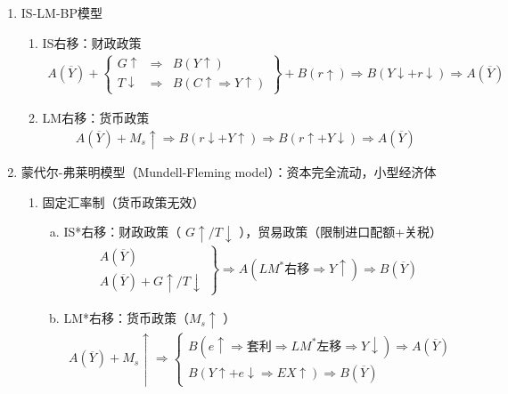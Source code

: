 \documentclass[12pt]{book}
\begin{document}
\begin{enumerate}[1.]
    \item IS-LM-BP模型
    \begin{enumerate}[(1)]
        \item IS右移：财政政策
        \begin{gather*}
            A(\overline{Y})+ \left\{\begin{matrix} G\uparrow&\Rightarrow& B(Y\uparrow)\\ 
            T\downarrow &\Rightarrow&  B(C\uparrow\Rightarrow Y\uparrow) \end{matrix}\right\}  +B(r\uparrow) \Rightarrow B(Y\downarrow+r\downarrow) \Rightarrow A(\overline{Y}) 
        \end{gather*}
        \item  LM右移：货币政策
        \begin{gather*}
            A(\overline{Y})+M_{s}\uparrow\Rightarrow B(r\downarrow+Y\uparrow)\Rightarrow B(r\uparrow+Y\downarrow)\Rightarrow A(\overline{Y}) 
        \end{gather*}
    \end{enumerate}
    \item 蒙代尔-弗莱明模型（Mundell-Fleming model）：资本完全流动，小型经济体
    \begin{enumerate}[(1)]
        \item 固定汇率制（货币政策无效）
        \begin{enumerate}[a.]
            \item IS*右移：财政政策（ $G\uparrow /T\downarrow $ ），贸易政策（限制进口配额+关税）
            \begin{gather*}
                \left.\begin{matrix} A(\overline{Y})\\ A(\overline{Y})+G\uparrow/T\downarrow \end{matrix}\right\} \Rightarrow A(LM^*\text{右移}\Rightarrow Y\uparrow)\Rightarrow B(\overline{Y}) 
            \end{gather*}
            \item LM*右移：货币政策（$ M_s\uparrow$ ）
            \begin{gather*}
                A(\overline{Y})+M_s \uparrow \Rightarrow 
                \left\{\begin{matrix} 
                    B(e\uparrow \Rightarrow 套利\Rightarrow LM^*左移\Rightarrow Y\downarrow)\Rightarrow A(\overline{Y})\\ 
                    B(Y↑+e↓\Rightarrow EX↑) \Rightarrow B(\overline{Y})

\end{matrix}
\end{gather*}
\end{enumerate}
\end{enumerate}
\end{enumerate}
\end{document}
